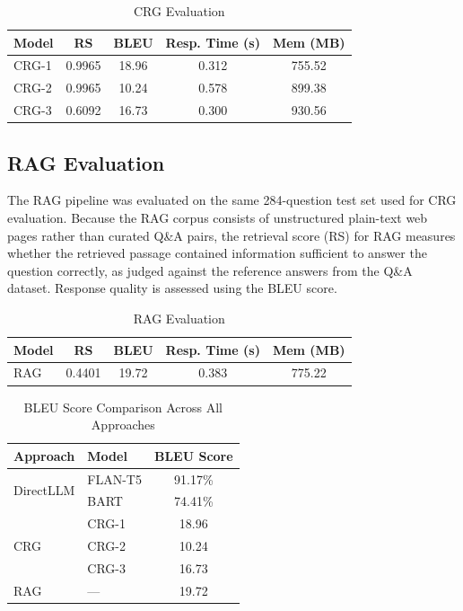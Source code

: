 \documentclass[conference]{IEEEtran}
\begin{document}
\begin{table}[!ht]
    \centering
    \caption{CRG Evaluation}
    \label{tab:crg_results}
    \begin{tabular}{l|c|c|c|c}
        \toprule
        \textbf{Model} & \textbf{RS} & \textbf{BLEU} & \textbf{Resp. Time (s)} & \textbf{Mem (MB)} \\
        \midrule
        CRG-1 & 0.9965 & 18.96 & 0.312 & 755.52 \\
        CRG-2 & 0.9965 & 10.24 & 0.578 & 899.38 \\
        CRG-3 & 0.6092 & 16.73 & 0.300 & 930.56 \\
        \bottomrule
    \end{tabular}
\end{table}

\subsection{RAG Evaluation}
The RAG pipeline was evaluated on the same 284-question test set used for CRG evaluation.
Because the RAG corpus consists of unstructured plain-text web pages rather than curated Q\&A pairs, the retrieval score (RS) for RAG measures whether the retrieved passage contained information sufficient to answer the question correctly, as judged against the reference answers from the Q\&A dataset. Response quality is assessed using the BLEU score.

\begin{table}[!ht]
    \centering
    \caption{RAG Evaluation}
    \label{tab:rag_results}
    \begin{tabular}{l|c|c|c|c}
        \toprule
        \textbf{Model} & \textbf{RS} & \textbf{BLEU} & \textbf{Resp. Time (s)} & \textbf{Mem (MB)} \\
        \midrule
        RAG & 0.4401 & 19.72 & 0.383 & 775.22 \\
        \bottomrule
    \end{tabular}
\end{table}

\noindent

\begin{table}[!ht]
    \centering
    \caption{BLEU Score Comparison Across All Approaches}
    \label{tab:bleu_comparison}
    \begin{tabular}{l|l|c}
        \toprule
        \textbf{Approach} & \textbf{Model} & \textbf{BLEU Score} \\
        \midrule
        \multirow{2}{*}{DirectLLM} & FLAN-T5 & 91.17\% \\
                                   & BART    & 74.41\% \\
        \midrule
        \multirow{3}{*}{CRG}       & CRG-1   & 18.96 \\
                                   & CRG-2   & 10.24 \\
                                   & CRG-3   & 16.73 \\
        \midrule
        RAG                        & ---     & 19.72 \\
        \bottomrule
    \end{tabular}
\end{table}
\end{document}
